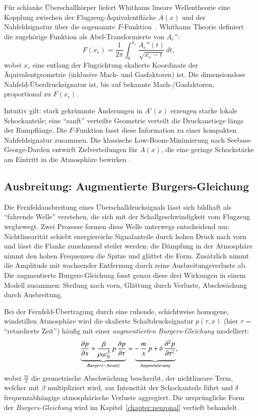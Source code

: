 Für schlanke Überschallkörper liefert Whithams lineare Wellentheorie eine
Kopplung zwischen der Flugzeug-Äquivalentfläche $A(x)$ und der
Nahfeldsignatur über die sogenannte $F$-Funktion~\cite{schall:whitham}.
Whithams Theorie definiert die zugehörige Funktion
als Abel-Transformierte von $A_e''$:
\begin{equation*}
    F(x_e)=\frac{1}{2\pi}\int_{0}^{x_e}\frac{A_e''(t)}{\!\sqrt{x_e-t}}\,dt,
\end{equation*}
wobei $x_e$ eine entlang der Flugrichtung skalierte Koordinate
der Äquivalentgeometrie (inklusive Mach- und Gasfaktoren) ist.
Die dimensionslose Nahfeld-Überdrucksignatur ist, bis auf bekannte
Mach-/Gasfaktoren, proportional zu $F(x_e)$.

Intuitiv gilt: stark gekrümmte Änderungen in $A'(x)$ erzeugen starke lokale
Schockanteile; eine ``sanft'' verteilte Geometrie verteilt die Druckanstiege
längs der Rumpflänge.
Die $F$-Funktion fasst diese Information zu einer kompakten Nahfeldsignatur zusammen.
Die klassische Low-Boom-Minimierung nach Seebass-George-Darden entwirft
Zielverteilungen für $A(x)$, die eine geringe Schockstärke am Eintritt in
die Atmosphäre bewirken \cite{schall:whitham,schall:seebassgeorge,schall:darden75}.

\subsection{Ausbreitung: Augmentierte Burgers-Gleichung}
Die Fernfeldausbreitung eines Überschalldrucksignals lässt sich bildhaft als
``fahrende Welle'' verstehen, die sich mit der Schallgeschwindigkeit vom
Flugzeug wegbewegt.
Zwei Prozesse formen diese Welle unterwegs entscheidend um:
Nichtlinearität schiebt energiereiche Signalanteile durch hohen
Druck nach vorn und lässt die Flanke zunehmend steiler werden;
die Dämpfung in der Atmosphäre nimmt den hohen Frequenzen die Spitze
%
und glättet die Form.
Zusätzlich nimmt die Amplitude mit wachsender Entfernung durch reine
Ausbreitungsverluste ab.
Die augmentierte Burgers-Gleichung fasst genau diese drei
Wirkungen in einem Modell zusammen: Steilung nach vorn, Glättung durch
Verluste, Abschwächung durch Ausbreitung.

Bei der Fernfeld-Übertragung durch eine ruhende, schichtweise homogene,
windstillen Atmosphäre wird die skalierte Schaltdrucksignatur $p(\tau,x)$
(hier $\tau$ = ``retardierte Zeit'') häufig mit einer
\emph{augmentierten Burgers-Gleichung} modelliert:
\begin{equation}
  \underbrace{\frac{\partial p}{\partial x}
  +\frac{\beta}{\rho_0 c_0^{3}}\,p\,\frac{\partial p}{\partial \tau}}_{Burgers-Ansatz}
  =
  \underbrace{-\,\frac{m}{x}\,p \vphantom{\frac{\beta}{\rho_0 c_0^{3}}}
  +\delta\,\frac{\partial^2 p}{\partial \tau^2}}_{Augmentierung},
  \label{eq:aug-burgers}
\end{equation}
wobei $\frac{m}{x}$ die geometrische Abschwächung beschreibt, der nichtlineare
Term, welcher mit $\beta$ multipliziert wird, zur Intensität der Schockanteile
führt und $\delta$ frequenzabhängige atmosphärische Verluste aggregiert.
Die ursprüngliche Form der \emph{Burgers-Gleichung} wird im
Kapitel~\ref{chapter:neuronal} vertieft behandelt.

